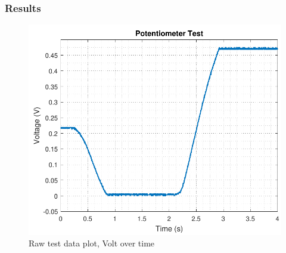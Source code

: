 \subsubsection{Results}
\begin{figure}[H] 
	\centering 
	\includegraphics[scale=0.7]{figures/TestPotentiometerResolution}
	\caption{Raw test data plot, Volt over time}
	\label{comparisonRealModel}
\end{figure}